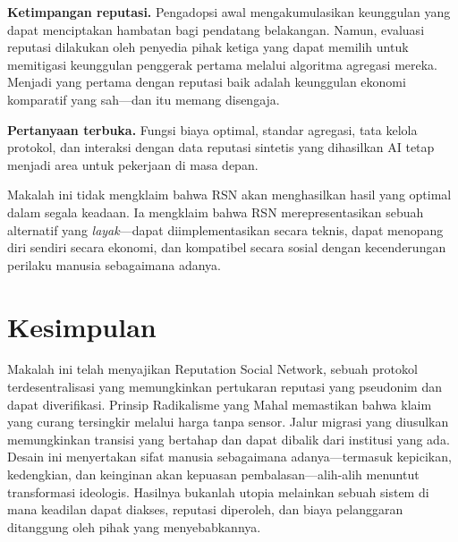 \documentclass[11pt,a4paper,twocolumn]{article}
\begin{document}
\textbf{Ketimpangan reputasi.} Pengadopsi awal mengakumulasikan keunggulan yang dapat menciptakan hambatan bagi pendatang belakangan. Namun, evaluasi reputasi dilakukan oleh penyedia pihak ketiga yang dapat memilih untuk memitigasi keunggulan penggerak pertama melalui algoritma agregasi mereka. Menjadi yang pertama dengan reputasi baik adalah keunggulan ekonomi komparatif yang sah---dan itu memang disengaja.

\textbf{Pertanyaan terbuka.} Fungsi biaya optimal, standar agregasi, tata kelola protokol, dan interaksi dengan data reputasi sintetis yang dihasilkan AI tetap menjadi area untuk pekerjaan di masa depan.

Makalah ini tidak mengklaim bahwa RSN akan menghasilkan hasil yang optimal dalam segala keadaan. Ia mengklaim bahwa RSN merepresentasikan sebuah alternatif yang \emph{layak}---dapat diimplementasikan secara teknis, dapat menopang diri sendiri secara ekonomi, dan kompatibel secara sosial dengan kecenderungan perilaku manusia sebagaimana adanya.

\section{Kesimpulan}

Makalah ini telah menyajikan Reputation Social Network, sebuah protokol terdesentralisasi yang memungkinkan pertukaran reputasi yang pseudonim dan dapat diverifikasi. Prinsip Radikalisme yang Mahal memastikan bahwa klaim yang curang tersingkir melalui harga tanpa sensor. Jalur migrasi yang diusulkan memungkinkan transisi yang bertahap dan dapat dibalik dari institusi yang ada. Desain ini menyertakan sifat manusia sebagaimana adanya---termasuk kepicikan, kedengkian, dan keinginan akan kepuasan pembalasan---alih-alih menuntut transformasi ideologis. Hasilnya bukanlah utopia melainkan sebuah sistem di mana keadilan dapat diakses, reputasi diperoleh, dan biaya pelanggaran ditanggung oleh pihak yang menyebabkannya.


\end{document}
